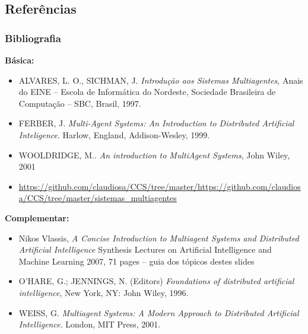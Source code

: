 
\subsection{Referências}  

\begin{frame}[allowframebreaks=0.9]
\frametitle{Bibliografia}  

\textbf{Básica:} 
\begin{itemize}

\item \scriptsize{ALVARES, L. O., SICHMAN, J. \textit{Introdução aos Sistemas
 Multiagentes}, Anais do EINE – Escola de Informática do Nordeste,
  Sociedade Brasileira de Computação – SBC, Brasil, 1997.}

\item \scriptsize{FERBER, J. \textit{Multi-Agent Systems: An Introduction 
to Distributed Artificial Inteligence}. Harlow, England, Addison-Wesley, 1999.}


\item \scriptsize{WOOLDRIDGE, M.. \textit{An introduction to
 MultiAgent Systems}, John Wiley, 2001}


\item \url{https://github.com/claudiosa/CCS/tree/master/https://github.com/claudiosa/CCS/tree/master/sistemas_multiagentes}

\end{itemize}

\textbf{Complementar:}

\begin{itemize}
\item \scriptsize{Nikos Vlassis,
\textit{A Concise Introduction to Multiagent Systems and Distributed Artificial Intelligence}
Synthesis Lectures on Artificial Intelligence and Machine Learning
2007, 71 pages -- guia dos tópicos destes slides
}


\item \scriptsize{
O’HARE, G.; JENNINGS, N. (Editors) \textit{Foundations of distributed artificial intelligence}, New York, NY: John Wiley, 1996.}


\item \scriptsize{
WEISS, G. \textit{Multiagent Systems: A Modern Approach to Distributed Artificial Intelligence}. London, MIT Press, 2001.
}





\end{itemize}
\end{frame}
